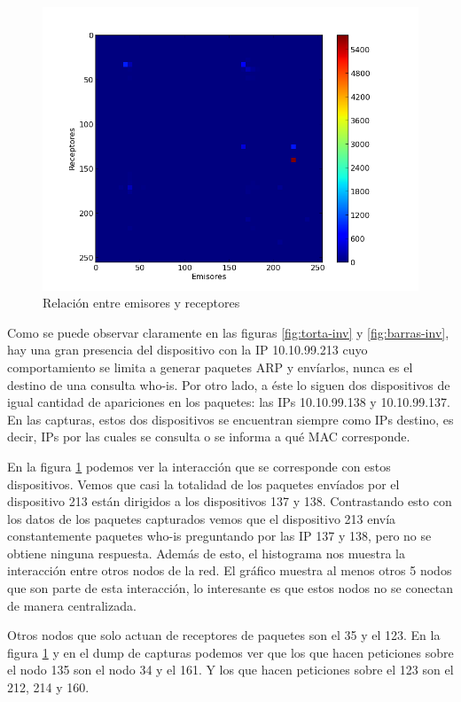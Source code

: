 \begin{figure}[!h]
  \includegraphics[width=\textwidth,keepaspectratio]{graph/hist2d-invgate.png}
  \caption{Relación entre emisores y receptores}
  \label{fig:hist2d-inv}
\end{figure}

Como se puede observar claramente en las figuras \ref{fig:torta-inv} y 
\ref{fig:barras-inv}, hay una gran presencia del dispositivo con la IP 10.10.99.213 cuyo comportamiento se limita a generar paquetes ARP y envíarlos, nunca es el destino de una consulta who-is. Por otro lado, a éste lo siguen dos dispositivos de igual cantidad de apariciones en los paquetes: las IPs 10.10.99.138 y 10.10.99.137. En las capturas, estos dos dispositivos se encuentran siempre como IPs destino, es decir, IPs por las cuales se consulta o se informa a qué MAC corresponde.
 
En la figura \ref{fig:hist2d-inv} podemos ver la interacción que se corresponde con estos dispositivos. Vemos que casi la totalidad de los paquetes envíados por el dispositivo 213 están dirigidos a los dispositivos 137 y 138. Contrastando esto con los datos de los paquetes capturados vemos que el dispositivo 213 envía constantemente paquetes who-is preguntando por las IP 137 y 138, pero no se obtiene ninguna respuesta.
Además de esto, el histograma nos muestra la interacción entre otros nodos de la red. El gráfico muestra al menos otros 5 nodos que son parte de esta interacción, lo interesante es que estos nodos no se conectan de manera centralizada.

Otros nodos que solo actuan de receptores de paquetes son el 35 y el 123. En la figura \ref{fig:hist2d-inv} y en el dump de capturas podemos ver que los que hacen peticiones sobre el nodo 135 son el nodo 34 y el 161. Y los que hacen peticiones sobre el 123 son el 212, 214 y 160.

